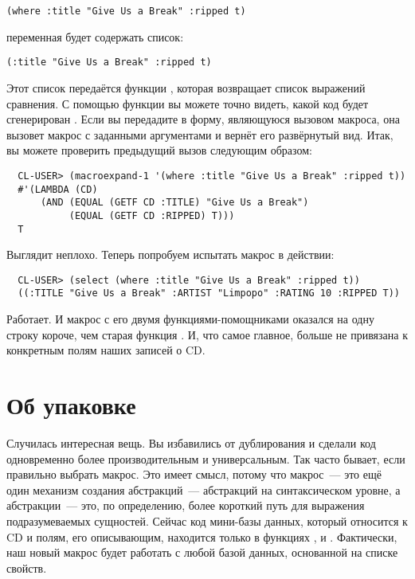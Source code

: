 \begin{lstlisting}
(where :title "Give Us a Break" :ripped t)
\end{lstlisting}

переменная  будет содержать список:

\begin{lstlisting}
(:title "Give Us a Break" :ripped t)
\end{lstlisting}

Этот список передаётся функции , которая возвращает список
выражений сравнения. С помощью функции  вы можете точно видеть,
какой код будет сгенерирован . Если вы передадите в 
форму, являющуюся вызовом макроса, она вызовет макрос с заданными аргументами и вернёт его
развёрнутый вид. Итак, вы можете проверить предыдущий вызов  следующим
образом:

\begin{verbatim}
  CL-USER> (macroexpand-1 '(where :title "Give Us a Break" :ripped t))
  #'(LAMBDA (CD)
      (AND (EQUAL (GETF CD :TITLE) "Give Us a Break")
           (EQUAL (GETF CD :RIPPED) T)))
  T
\end{verbatim}

Выглядит неплохо. Теперь попробуем испытать макрос в действии:

\begin{verbatim}
  CL-USER> (select (where :title "Give Us a Break" :ripped t))
  ((:TITLE "Give Us a Break" :ARTIST "Limpopo" :RATING 10 :RIPPED T))
\end{verbatim}

Работает. И макрос  с его двумя функциями-помощниками оказался на одну строку
короче, чем старая функция . И, что самое главное,  больше не
привязана к конкретным полям наших записей о CD.

\section{Об упаковке}

Случилась интересная вещь. Вы избавились от дублирования и сделали код одновременно более
производительным и универсальным. Так часто бывает, если правильно выбрать макрос. Это
имеет смысл, потому что макрос~--- это ещё один механизм создания абстракций~---
абстракций на синтаксическом уровне, а абстракции~--- это, по определению, более короткий
путь для выражения подразумеваемых сущностей. Сейчас код мини-базы данных, который
относится к CD и полям, его описывающим, находится только в функциях ,
 и . Фактически, наш новый макрос будет работать с любой
базой данных, основанной на списке свойств.

